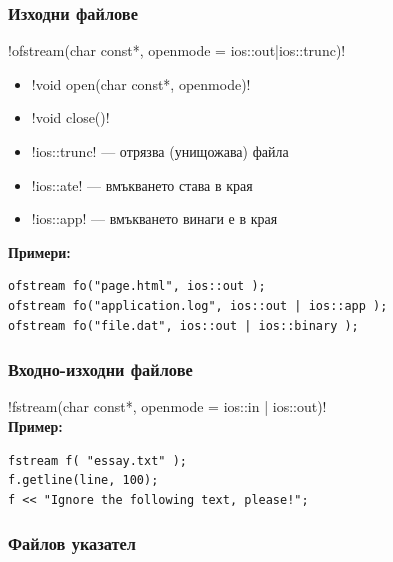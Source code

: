 \documentclass{beamer}
\begin{document}
\begin{frame}[fragile]
  \frametitle{Изходни файлове}

  \lst!ofstream(char const*, openmode = ios::out|ios::trunc)!\\[1em]
  \begin{itemize}
  \item \lst!void open(char const*, openmode)!
  \item \lst!void close()!
  \item \lst!ios::trunc! --- отрязва (унищожава) файла
  \item \lst!ios::ate! --- вмъкването става в края
  \item \lst!ios::app! --- вмъкването винаги е в края
  \end{itemize}
  \vspace{1em}
  \pause
  \textbf{Примери:}
\begin{lstlisting}
ofstream fo("page.html", ios::out );
ofstream fo("application.log", ios::out | ios::app );
ofstream fo("file.dat", ios::out | ios::binary );
\end{lstlisting}
\end{frame}

\begin{frame}[fragile]
  \frametitle{Входно-изходни файлове}

  \lst!fstream(char const*, openmode = ios::in | ios::out)!\\[3em]
  \pause
  \textbf{Пример:}
\begin{lstlisting}
fstream f( "essay.txt" );
f.getline(line, 100);
f << "Ignore the following text, please!";
\end{lstlisting}
\end{frame}

\begin{frame}[<1-2>]
  \frametitle{Файлов указател}

  \pause
\end{frame}
\end{document}
